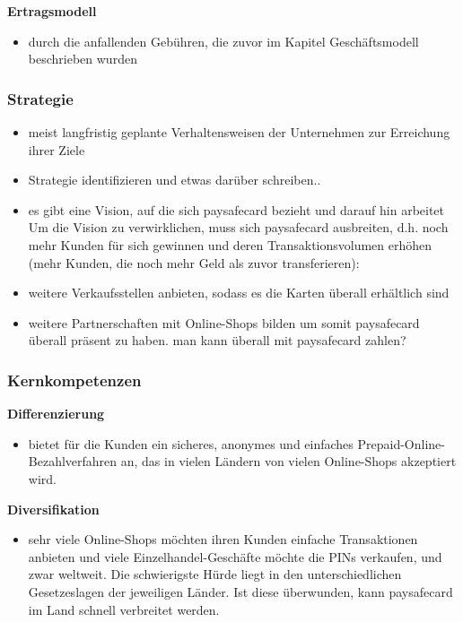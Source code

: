 \textbf{Ertragsmodell}
\begin{itemize}
        \item durch die anfallenden Gebühren, die zuvor im Kapitel Geschäftsmodell beschrieben wurden

\end{itemize}

\subsubsection{Strategie}
\begin{itemize}
        \item meist langfristig geplante Verhaltensweisen der Unternehmen zur Erreichung ihrer Ziele
        \item Strategie identifizieren und etwas darüber schreiben..

        \item es gibt eine Vision, auf die sich paysafecard bezieht und darauf hin arbeitet
        Um die Vision zu verwirklichen, muss sich paysafecard ausbreiten, d.h.  noch mehr Kunden für sich gewinnen und deren Transaktionsvolumen        erhöhen (mehr Kunden, die noch mehr Geld als zuvor transferieren):
        \item weitere Verkaufsstellen anbieten, sodass es die Karten überall erhältlich sind
        \item weitere Partnerschaften mit Online-Shops bilden um somit paysafecard überall präsent zu haben. man kann überall mit paysafecard zahlen?


\end{itemize}

\subsubsection{Kernkompetenzen}

\textbf{Differenzierung}
\begin{itemize}
        \item bietet für die Kunden ein sicheres, anonymes und einfaches Prepaid-Online-Bezahlverfahren an, das in vielen Ländern von vielen Online-Shops akzeptiert wird.
\end{itemize}

\textbf{Diversifikation}
\begin{itemize}
        \item sehr viele Online-Shops möchten ihren Kunden einfache Transaktionen anbieten und viele Einzelhandel-Geschäfte möchte die PINs verkaufen, und zwar weltweit. Die schwierigste Hürde liegt in den unterschiedlichen Gesetzeslagen der jeweiligen Länder. Ist diese überwunden, kann paysafecard im Land schnell verbreitet werden.
\end{itemize}

